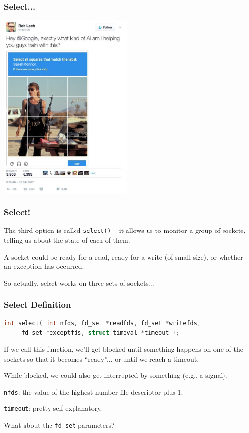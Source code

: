 \begin{frame}
	\frametitle{Select...}

	\begin{center}
		\includegraphics[width=0.5\textwidth]{images/sarahconnor.png}
	\end{center}

\end{frame}

\begin{frame}
	\frametitle{Select!}

	The third option is called \texttt{select()} -- it allows us to monitor a group of sockets, telling us about the state of each of them.

	A socket could be ready for a read, ready for a write (of small size), or whether an exception has occurred.

	So actually, select works on three sets of sockets...

\end{frame}

\begin{frame}[fragile]
	\frametitle{Select Definition}

	\begin{lstlisting}[language=C]
 int select( int nfds, fd_set *readfds, fd_set *writefds, 
     fd_set *exceptfds, struct timeval *timeout );
\end{lstlisting}

	If we call this function, we'll get blocked until something happens on one of the sockets so that it becomes ``ready''... or until we reach a timeout.

	While blocked, we could also get interrupted by something (e.g., a signal).

	\texttt{nfds}: the value of the highest number file descriptor plus 1.

	\texttt{timeout}: pretty self-explanatory.

	What about the \texttt{fd\_set} parameters?

\end{frame}

